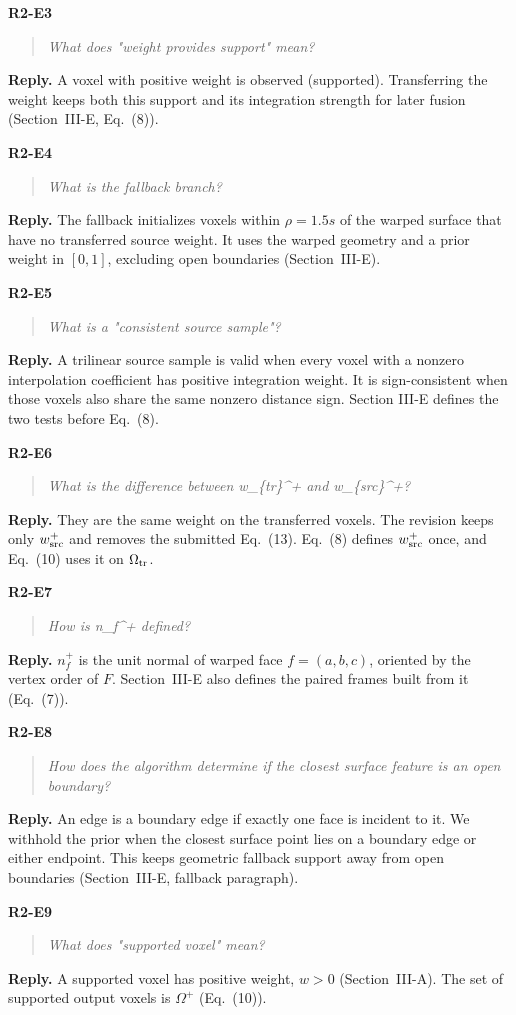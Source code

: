 \documentclass[11pt,a4paper]{article}
\newcommand{\point}[2]{\par\medskip\textbf{#1}\par\begin{quote}\itshape #2\end{quote}}
\newenvironment{reply}{\begingroup\color{replyblue}\textbf{Reply.} }{\par\endgroup}
\begin{document}
\point{R2-E3}{What does "weight provides support" mean?}
\begin{reply}
A voxel with positive weight is observed (supported). Transferring the weight keeps both this support and its integration strength for later fusion (Section~III-E, Eq.~(8)).
\end{reply}

\point{R2-E4}{What is the fallback branch?}
\begin{reply}
The fallback initializes voxels within $\rho=1.5s$ of the warped surface that have no transferred source weight. It uses the warped geometry and a prior weight in $[0,1]$, excluding open boundaries (Section~III-E).
\end{reply}

\point{R2-E5}{What is a "consistent source sample"?}
\begin{reply}
A trilinear source sample is valid when every voxel with a nonzero interpolation coefficient has positive integration weight. It is sign-consistent when those voxels also share the same nonzero distance sign. Section III-E defines the two tests before Eq.~(8).
\end{reply}

\point{R2-E6}{What is the difference between w\_\{tr\}\textasciicircum{}+ and w\_\{src\}\textasciicircum{}+?}
\begin{reply}
They are the same weight on the transferred voxels. The revision keeps only $w_{\rm src}^+$ and removes the submitted Eq.~(13). Eq.~(8) defines $w_{\rm src}^+$ once, and Eq.~(10) uses it on $\Omega_{\rm tr}$.
\end{reply}

\point{R2-E7}{How is n\_f\textasciicircum{}+ defined?}
\begin{reply}
$n_f^+$ is the unit normal of warped face $f=(a,b,c)$, oriented by the vertex order of $F$. Section~III-E also defines the paired frames built from it (Eq.~(7)).
\end{reply}

\point{R2-E8}{How does the algorithm determine if the closest surface feature is an open boundary?}
\begin{reply}
An edge is a boundary edge if exactly one face is incident to it. We withhold the prior when the closest surface point lies on a boundary edge or either endpoint. This keeps geometric fallback support away from open boundaries (Section~III-E, fallback paragraph).
\end{reply}

\point{R2-E9}{What does "supported voxel" mean?}
\begin{reply}
A supported voxel has positive weight, $w>0$ (Section~III-A). The set of supported output voxels is $\Omega^+$ (Eq.~(10)).
\end{reply}
\end{document}

